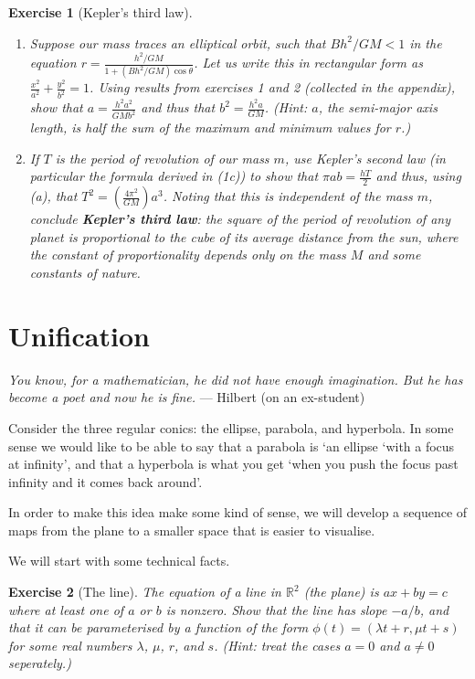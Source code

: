 \documentclass[a4paper,leqno,10pt]{article}
\theoremstyle{exercise}
\newtheorem{Exercise}{Exercise}
\newenvironment{exercise}
  {\begin{mdframed}\begin{Exercise}}
  {\end{Exercise}\end{mdframed}}
\theoremstyle{plain}
\theoremstyle{definition}
\theoremstyle{remark}
\newcommand{\df}{\textbf}
\begin{document}
\begin{exercise}[Kepler's third law]
  \begin{enumerate}
    \item Suppose our mass traces an elliptical orbit, such that $ Bh^2/GM < 1 $ in the equation $ r = \frac{h^2/GM}{1 + (Bh^2/GM)\cos\theta} $.
          Let us write this in rectangular form as $ \frac{x^2}{a^2} + \frac{y^2}{b^2} = 1 $. Using results from exercises 1 and 2 (collected
          in the appendix), show that $ a = \frac{h^2a^2}{GMb^2} $ and thus that $ b^2 = \frac{h^2a}{GM} $. (Hint: $ a $, the semi-major axis
          length, is half the sum of the maximum and minimum values for $ r $.)
    \item If $ T $ is the period of revolution of our mass $ m $, use Kepler's second law (in particular the formula derived in (1c)) to show
          that $ \pi ab = \frac{hT}{2} $ and thus, using (a), that $ T^2 = \left(\frac{4\pi^2}{GM}\right)a^3 $. Noting that this is independent
          of the mass $ m $, conclude \df{Kepler's third law}: the square of the period of revolution of any planet is proportional
          to the cube of its average distance from the sun, where the constant of proportionality depends only on the mass $ M $ and
          some constants of nature.
  \end{enumerate}
\end{exercise}

\section{Unification}
\begin{center}
  \emph{You know, for a mathematician, he did not have enough imagination. But he has become a poet and now he is fine.} --- Hilbert (on an ex-student)
\end{center}

Consider the three regular conics: the ellipse, parabola, and hyperbola. In some sense we would like to be able to say that a parabola is `an
ellipse `with a focus at infinity', and that a hyperbola is what you get `when you push the focus past infinity and it comes back around'.

In order to make this idea make some kind of sense, we will develop a sequence of maps from the plane to a smaller space that is easier to
visualise.

We will start with some technical facts.
\begin{exercise}[The line]
  The equation of a line in $ \mathbb{R}^2 $ (the plane) is $ ax + by = c $ where at least one of $ a $ or $ b $ is nonzero. Show that the line has
  slope $ -a/b $, and that it can be parameterised by a function of the form $ \phi(t) = (\lambda t + r, \mu t + s) $ for some real
  numbers $ \lambda $, $ \mu $, $ r $, and $ s $. (Hint: treat the cases $ a = 0 $ and $ a \neq 0 $ seperately.)
\end{exercise}
\end{document}

